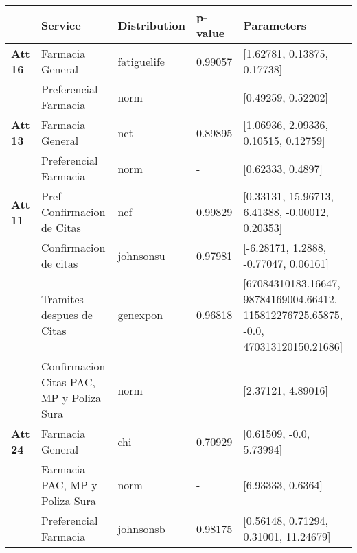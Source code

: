 \begin{longtable}[c]{lp{3cm}llp{5cm}}
\hline
       & \textbf{Service}                                  & \textbf{Distribution} & \textbf{p-value} & \textbf{Parameters}                                                                               \\ \hline
\textbf{Att 16} & Farmacia General                         & fatiguelife  & 0.99057 & {[}1.62781, 0.13875, 0.17738{]}                                                          \\
       & Preferencial Farmacia                    & norm         & -       & {[}0.49259, 0.52202{]}                                                                   \\ \hline
\textbf{Att 13} & Farmacia General                         & nct          & 0.89895 & {[}1.06936, 2.09336, 0.10515, 0.12759{]}                                                 \\
       & Preferencial Farmacia                    & norm         & -       & {[}0.62333, 0.4897{]}                                                                    \\ \hline
\textbf{Att 11} & Pref Confirmacion de Citas               & ncf          & 0.99829 & {[}0.33131, 15.96713, 6.41388, -0.00012, 0.20353{]}                                      \\
       & Confirmacion de citas                    & johnsonsu    & 0.97981 & {[}-6.28171, 1.2888, -0.77047, 0.06161{]}                                                \\
       & Tramites despues de Citas                & genexpon     & 0.96818 & {[}67084310183.16647, 98784169004.66412, 115812276725.65875, -0.0, 470313120150.21686{]} \\
       & Confirmacion Citas PAC, MP y Poliza Sura & norm         & -       & {[}2.37121, 4.89016{]}                                                                   \\ \hline
\textbf{Att 24} & Farmacia General                         & chi          & 0.70929 & {[}0.61509, -0.0, 5.73994{]}                                                             \\
       & Farmacia PAC, MP y Poliza Sura           & norm         & -       & {[}6.93333, 0.6364{]}                                                                    \\
       & Preferencial Farmacia                    & johnsonsb    & 0.98175 & {[}0.56148, 0.71294, 0.31001, 11.24679{]}                                                \\ \hline

\end{longtable}
